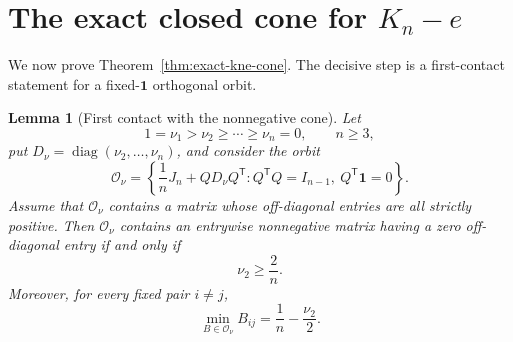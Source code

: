 \documentclass[11pt,reqno]{amsart}
\newtheorem{lemma}[theorem]{Lemma}
\theoremstyle{definition}
\theoremstyle{remark}
\newcommand{\one}{\mathbf 1}
\begin{document}
\section{The exact closed cone for \texorpdfstring{$K_n-e$}{Kn-e}}
\label{sec:exact-kne}

We now prove Theorem~\ref{thm:exact-kne-cone}.  The decisive step is a
first-contact statement for a fixed-$\one$ orthogonal orbit.

\begin{lemma}[First contact with the nonnegative cone]
\label{lem:orbit-first-contact}
Let
\[
  1=\nu_1>\nu_2\ge\cdots\ge\nu_n=0,
  \qquad n\ge3,
\]
put $D_\nu=\operatorname{diag}(\nu_2,\ldots,\nu_n)$, and consider the orbit
\[
  \mathcal O_\nu=
  \left\{\frac1nJ_n+QD_\nu Q^{\mathsf T}:
  Q^{\mathsf T}Q=I_{n-1},\ Q^{\mathsf T}\one=0\right\}.
\]
Assume that $\mathcal O_\nu$ contains a matrix whose off-diagonal entries
are all strictly positive.  Then $\mathcal O_\nu$ contains an entrywise
nonnegative matrix having a zero off-diagonal entry if and only if
\begin{equation}\label{eq:first-contact-threshold}
  \nu_2\ge\frac2n.
\end{equation}
Moreover, for every fixed pair $i\ne j$,
\begin{equation}\label{eq:orbit-entry-minimum}
  \min_{B\in\mathcal O_\nu}B_{ij}=\frac1n-\frac{\nu_2}{2}.
\end{equation}
\end{lemma}
\end{document}
